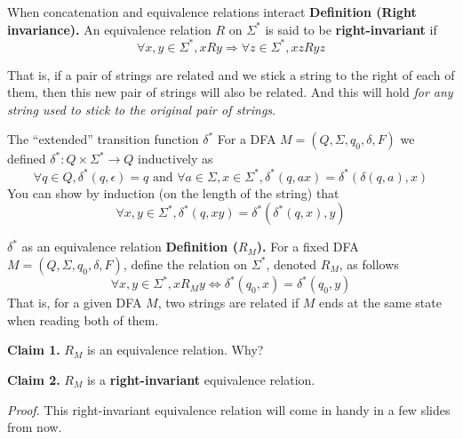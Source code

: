 \documentclass[10pt]{beamer}
\begin{document}
\begin{frame}[t]{When concatenation and equivalence relations interact}
    \textbf{Definition (Right invariance).} An equivalence relation $R$ on $\Sigma^*$ is said to be \textbf{right-invariant} if
    \[
        \forall x, y \in \Sigma^*, xRy \Rightarrow \forall z \in \Sigma^*, xzRyz
    \]

    That is, if a pair of strings are related and we stick a string to the right of each of them, then this new pair of strings will also be related. And this will hold \textit{for any string used to stick to the original pair of strings}.

\end{frame}

\begin{frame}{The ``extended'' transition function $\delta^*$}
    For a DFA $M=(Q, \Sigma, q_0, \delta, F)$ we defined $\delta^*: Q \times \Sigma^* \rightarrow Q$ inductively as
    \[
        \forall q \in Q, \delta^*(q, \epsilon) = q \text{ and } \forall a \in \Sigma, x \in \Sigma^*, \delta^*(q, ax) = \delta^*(\delta(q, a), x)
    \]
    You can show by induction (on the length of the string) that
    \[
        \forall x, y \in \Sigma^*, \delta^*(q, xy) = \delta^*(\delta^*(q, x), y)
    \]
\end{frame}

\begin{frame}[t]{$\delta^*$ as an equivalence relation}
    \textbf{Definition ($R_M$).} For a fixed DFA $M=(Q, \Sigma, q_0, \delta, F)$, define the relation on $\Sigma^*$, denoted $R_M$, as follows
    \[
        \forall x, y \in \Sigma^*, xR_My \iff \delta^*(q_0, x) = \delta^*(q_0, y)
    \]
    That is, for a given DFA $M$, two strings are related if $M$ ends at the same state when reading both of them.

    \textbf{Claim 1.} $R_M$ is an equivalence relation. Why?

    \textbf{Claim 2.} $R_M$ is a \textbf{right-invariant} equivalence relation.

    \textit{Proof.}
    \vfill
    \vspace{2em}
    This right-invariant equivalence relation will come in handy in a few slides from now.

\end{frame}
\end{document}
